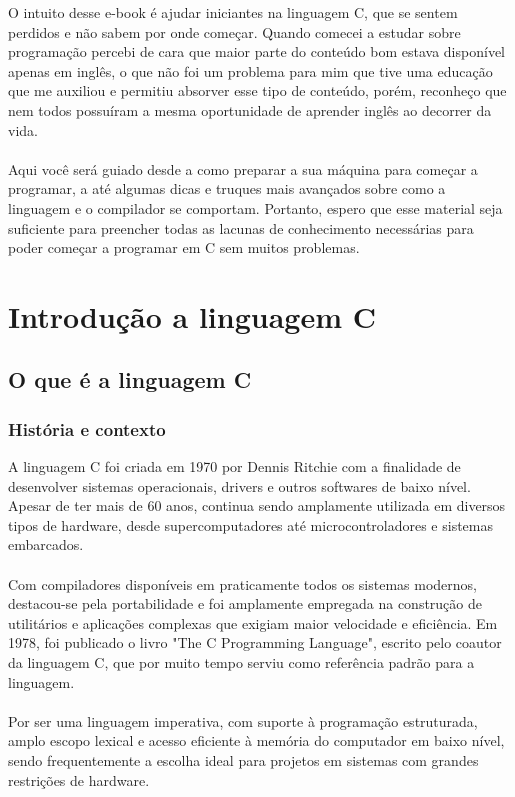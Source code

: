 \documentclass{book}
\begin{document}
O intuito desse e-book é ajudar iniciantes na linguagem C, que se 
sentem perdidos e não sabem por onde começar. Quando comecei a estudar sobre 
programação percebi de cara que maior parte do conteúdo bom estava disponível 
apenas em inglês, o que não foi um problema para mim que tive uma educação 
que me auxiliou e permitiu absorver esse tipo de conteúdo, porém, reconheço 
que nem todos possuíram a mesma oportunidade de aprender inglês ao decorrer 
da vida.
\\\\
Aqui você será guiado desde a como preparar a sua máquina para começar 
a programar, a até algumas dicas e truques mais avançados sobre como a linguagem 
e o compilador se comportam. Portanto, espero que esse material seja suficiente 
para preencher todas as lacunas de conhecimento necessárias para poder começar 
a programar em C sem muitos problemas.

\chapter{Introdução a linguagem C}
\clearpage

\section{O que é a linguagem C}
\subsection{História e contexto}

A linguagem C foi criada em 1970 por Dennis Ritchie com a finalidade de 
desenvolver sistemas operacionais, drivers e outros softwares de baixo 
nível. Apesar de ter mais de 60 anos, continua sendo amplamente 
utilizada em diversos tipos de hardware, desde supercomputadores até 
microcontroladores e sistemas embarcados.
\\\\
Com compiladores disponíveis em praticamente todos os sistemas modernos, 
destacou-se pela portabilidade e foi amplamente empregada na construção 
de utilitários e aplicações complexas que exigiam maior velocidade e 
eficiência. Em 1978, foi publicado o livro "The C Programming Language", 
escrito pelo coautor da linguagem C, que por muito tempo serviu como 
referência padrão para a linguagem.
\\\\
Por ser uma linguagem imperativa, com suporte à programação estruturada, 
amplo escopo lexical e acesso eficiente à memória do computador em 
baixo nível, sendo frequentemente a escolha ideal para projetos em 
sistemas com grandes restrições de hardware.
\end{document}
